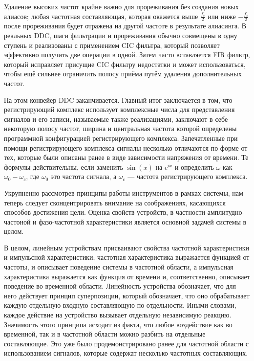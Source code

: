 \documentclass{report}
\begin{document}
Удаление высоких частот крайне важно для прореживания без создания новых алиасов; любая частотная составляющая, которая окажется выше $\frac{f_s}{2}$ или ниже $-\frac{f_s}{2}$ после прореживания будет отражена на другой частоте в результате алиасинга. В реальных DDC, шаги фильтрации и прореживания обычно совмещены в одну ступень и реализованы с применением CIC фильтра, который позволяет эффективно получить две операции в одной. Затем часто вставляется FIR фильтр, который исправляет присущие CIC фильтру недостатки и может использоваться, чтобы ещё сильнее ограничить полосу приёма путём удаления дополнительных частот.

На этом конвейер DDC заканчивается. Главный итог заключается в том, что регистрирующий комплекс использует комплексные числа для представления сигналов и его записи, называемые также реализациями, заключают в себе некоторую полосу частот, ширина и центральная частота которой определены программной конфигурацией регистрирующего комплекса. Запечатленные при помощи регистрирующего комплекса сигналы несколько отличаются по форме от тех, которые были описаны ранее в виде зависимости напряжения от времени. Те формулы действительны, если заменить $\sin(x)$ на $e^{ix}$ и определить $\omega$ как $\omega_0 - \omega_c$, где $\omega_0$ это частота сигнала, а $\omega_c$ --- частота регистрирующего комплекса.

Укрупненно рассмотрев принципы работы инструментов в рамках системы, нам теперь следует сконцентрировать внимание на соображениях, касающихся способов достижения цели. Оценка свойств устройств, в частности амплитудно-частоной и фазо-частотной характеристики является основной задачей системы в целом.

В целом, линейным устройствам присваивают свойства частотной характеристики и импульсной характеристики; частотная характеристика выражается функцией от частоты, и описывает поведение системы в частотной области, а импульсная характеристика выражается как функция от времени и, соответственно, описывает поведение во временной области. Линейность устройства обозначает, что для него действует принцип суперпозиции, который обозначает, что оно обрабатывает каждую отдельную входную составляющую по отдельности. Иными словами, каждое действие на устройство вызывает отдельную независимую реакцию. Значимость этого принципа исходит из факта, что любое воздействие как во временной, так и в частотной области можно разбить на отдельные составляющие. Это уже было продемонстрировано ранее для частотной области с использованием сигналов, которые содержат несколько частотных составляющих.
\end{document}
